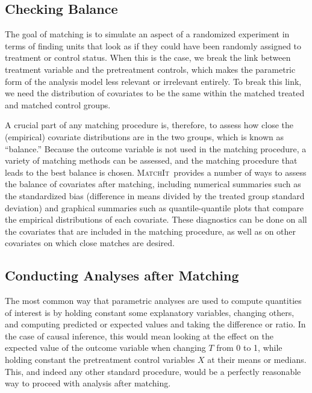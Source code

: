 \documentclass[oneside,letterpaper,titlepage]{article}
\newcommand{\MatchIt}{\textsc{MatchIt}}
\begin{document}
\subsection{Checking Balance}
\label{subsec:balance-sum}

The goal of matching is to simulate an aspect of a randomized
experiment in terms of finding units that look as if they could have
been randomly assigned to treatment or control status.  When this is
the case, we break the link between treatment variable and the
pretreatment controls, which makes the parametric form of the analysis
model less relevant or irrelevant entirely.  To break this link, we
need the distribution of covariates to be the same within the matched
treated and matched control groups. 

A crucial part of any matching procedure is, therefore, to assess how
close the (empirical) covariate distributions are in the two groups,
which is known as ``balance.''  Because the outcome variable is not
used in the matching procedure, a variety of matching methods can be
assessed, and the matching procedure that leads to the best balance is
chosen.  \MatchIt\ provides a number of ways to assess the balance of
covariates after matching, including numerical summaries such as the
standardized bias (difference in means divided by the treated group
standard deviation) and graphical summaries such as quantile-quantile
plots that compare the empirical distributions of each covariate.
These diagnostics can be done on all the covariates that are included
in the matching procedure, as well as on other covariates on which
close matches are desired.

\subsection{Conducting Analyses after Matching}

The most common way that parametric analyses are used to compute
quantities of interest is by holding constant some explanatory
variables, changing others, and computing predicted or expected values
and taking the difference or ratio.  In the case of causal inference,
this would mean looking at the effect on the expected value of the
outcome variable when changing $T$ from 0 to 1, while holding constant
the pretreatment control variables $X$ at their means or medians.
This, and indeed any other standard procedure, would be a perfectly
reasonable way to proceed with analysis after matching.
\end{document}
